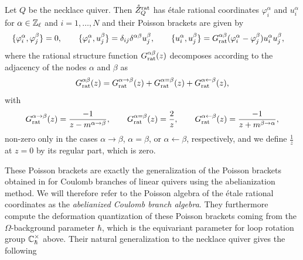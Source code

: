\begin{prop}
	Let $Q$ be the necklace quiver. Then $\mathring Z_Q^\textup{rat}$ has étale rational coordinates $\varphi_i^\alpha$ and $u_i^\alpha$ for $\alpha \in \mathbb{Z}_\ell$ and $i=1,\dots,N$ and their Poisson brackets are given by
	\begin{align}\label{eq:etaleCoordsPB}
		\{ \varphi_i^\alpha,\varphi_j^\beta \} &= 0, \qquad
		\{ \varphi_i^\alpha,u_j^\beta \} = \delta_{ij} \delta^{\alpha\beta} u_j^\beta, \qquad
		\{ u_i^\alpha,u_j^\beta \} = G_\textup{rat}^{\alpha\beta}(\varphi_i^\alpha - \varphi_j^\beta) u_i^\alpha u_j^\beta,
	\end{align}
	where the rational structure function $G_\textup{rat}^{\alpha\beta}(z)$ decomposes according to the adjacency of the nodes $\alpha$ and $\beta$ as
	\begin{equation}
		G_\textup{rat}^{\alpha\beta}(z) = G_\textup{rat}^{\alpha \to \beta}(z) + G_\textup{rat}^{\alpha = \beta}(z) + G_\textup{rat}^{\alpha \leftarrow \beta}(z),
	\end{equation}
	with
	\begin{align}
		G_\textup{rat}^{\alpha \to \beta}(z) = \frac{-1}{z-m^{\alpha\to\beta}}, \qquad
		G_\textup{rat}^{\alpha = \beta}(z) = \frac{2}{z}, \qquad
		G_\textup{rat}^{\alpha \leftarrow \beta}(z) = \frac{-1}{z+m^{\beta\to\alpha}},
	\end{align}
	non-zero only in the cases $\alpha \to \beta$, $\alpha = \beta$, or $\alpha \leftarrow \beta$, respectively, and we define $\frac{1}{z}$ at $z=0$ by its regular part, which is zero.
\end{prop}

\begin{remark}
	These Poisson brackets are exactly the generalization of the Poisson brackets obtained in \cite{bullimore_coulomb_2015} for Coulomb branches of linear quivers using the abelianization method. We will therefore refer to the Poisson algebra of the étale rational coordinates as the \emph{abelianized Coulomb branch algebra}. They furthermore compute the deformation quantization of these Poisson brackets coming from the $\Omega$-background parameter $\hbar$, which is the equivariant parameter for loop rotation group $\mathbb{C}_\hbar^\times$ above. Their natural generalization to the necklace quiver gives the following
\end{remark}

